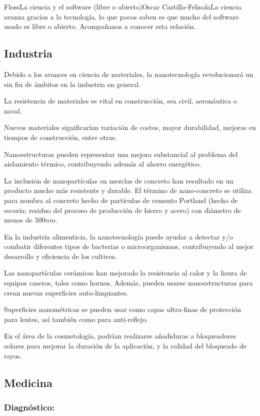 \begin{article}[2]{Floss}{La ciencia y el software (libre o abierto)}{Oscar Castillo-Felisola}{La ciencia avanza gracias a la tecnolog\'ia, lo que pocos saben es que mucho del software usado es libre o abierto. Acompa\~nanos a conocer esta relaci\'on.}
\subsection{Industria}

Debido a los avances en ciencia de materiales, la nanotecnolog\'ia revolucionar\'a un sin fin de \'ambitos en la industria en general.

La resistencia de materiales es vital en construcci\'on, sea civil, aeron\'autica o naval. 

Nuevos materiales significar\'ian variaci\'on de costos, mayor durabilidad, mejoras en tiempos de construcci\'on, entre otras.

Nanoestructuras pueden representar una mejora substancial al problema del aislamiento t\'ermico, contribuyendo adem\'as al ahorro energ\'etico.

La inclusi\'on de nanopart\'iculas en mezclas de concreto han resultado en un producto mucho m\'as resistente y durable. El t\'ermino de nano-concreto se utiliza para nombra al concreto hecho de part\'iculas de cemento Portland (hecho de escoria: residuo del proceso de producci\'on de hierro y acero) con di\'ametro de menos de $500 n m$.


En la industria alimenticia, la nanotecnolog\'ia puede ayudar a detectar y/o combatir diferentes tipos de bacterias o microorganismos, contribuyendo al mejor desarrollo y eficiencia de los cultivos.

Las nanopart\'iculas cer\'amicas han mejorado la resistencia al calor y la lisura de equipos caseros, tales como hornos. Adem\'as, pueden usarse nanoestructuras para crean nuevas superficies auto-limpiantes.

Superficies nanom\'etricas se pueden usar como capas ultra-finas de protecci\'on para lentes, as\'i tambi\'en como para anti-reflejo.

En el \'area de la cosmetolog\'ia, podr\'ian realizarse a\~nadiduras a bloqueadores solares para mejorar la duraci\'on de la aplicaci\'on, y la calidad del bloqueado de rayos.

\subsection{Medicina}
\subsubsection*{Diagn\'ostico:}


\end{article}
